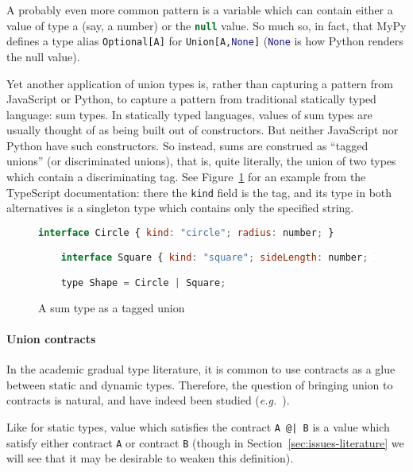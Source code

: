 \documentclass[sigplan,10pt,review,anonymous]{acmart}
\newcommand{\nickel}[1]{\lstinline[language=nickel]{#1}}
\newcommand{\typescript}[1]{\lstinline[language=JavaScript]{#1}}
\newcommand{\python}[1]{\lstinline[language=Python]{#1}}
\begin{document}
A probably even more common pattern is a variable which can contain
either a value of type a (say, a number) or the \typescript{null}
value. So much so, in fact, that MyPy defines a type alias
\python{Optional[A]} for \python{Union[A,None]} (\python{None} is how
Python renders the null value).

Yet another application of union types is, rather than capturing a
pattern from JavaScript or Python, to capture a pattern from
traditional statically typed language: sum types. In statically typed
languages, values of sum types are usually thought of as being built
out of constructors. But neither JavaScript nor Python have such
constructors. So instead, sums are construed as ``tagged unions'' (or
discriminated unions), that is, quite literally, the union of two
types which contain a discriminating tag. See
Figure~\ref{fig:tagged-union} for an example from the TypeScript
documentation: there the \typescript{kind} field is the tag, and its
type in both alternatives is a singleton type which contains only the
specified string.

\begin{figure}
  \centering
  \begin{lstlisting}[language=JavaScript]
    interface Circle { kind: "circle"; radius: number; }

    interface Square { kind: "square"; sideLength: number; }

    type Shape = Circle | Square;
  \end{lstlisting}

  \caption{A sum type as a tagged union}
  \label{fig:tagged-union}
\end{figure}

\paragraph{Union contracts}

In the academic gradual type literature, it is common to use contracts
as a glue between static and dynamic types. Therefore, the question of
bringing union to contracts is natural, and have indeed been studied
(\emph{e.g.}~\cite{KeilThiemannUnionIntersection,RootCauseOfBlame}).

Like for static types, value which satisfies the contract \nickel{A @| B}
is a value which satisfy either contract \nickel{A} or
contract \nickel{B} (though in Section~\ref{sec:issues-literature} we
will see that it may be desirable to weaken this definition).
\end{document}

